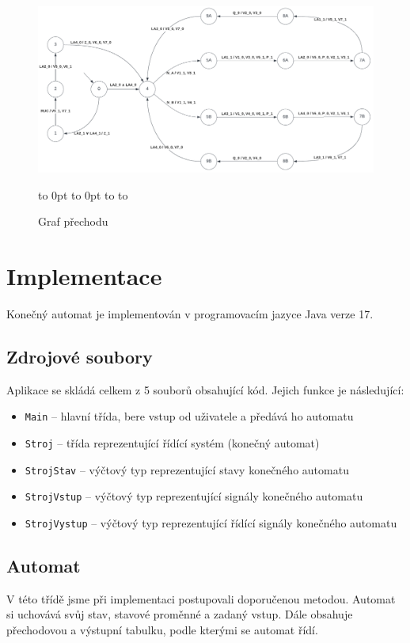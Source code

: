 \documentclass[12pt]{report}
\newcommand\horizontalpagenumber{
	\pagestyle{empty}
	\vbox to 0pt{\vss}\vfill
	\vbox to 0pt{\baselineskip0pt
	\hbox to\linewidth{\hss}
	\baselineskip\footskip
	\hbox to\linewidth{
	\hfil\thepage\hspace{30mm}}\vss}
}
\begin{document}
	\begin{landscape}
		\begin{figure}
			\centering
			\includegraphics[width=1.3\textwidth]{graf}
			\caption{Graf přechodu}
			\label{fig:graf}
			\horizontalpagenumber
			\end{figure}
	\end{landscape}
	\restoregeometry
	
	\chapter{Implementace}
	Konečný automat je implementován v programovacím jazyce Java verze 17.
	
	\section{Zdrojové soubory}
	Aplikace se skládá celkem z 5 souborů obsahující kód. Jejich funkce je následující:
	
	 \begin{itemize}
		\item \texttt{Main} – hlavní třída, bere vstup od uživatele a předává ho automatu
		\item \texttt{Stroj} – třída reprezentující řídící systém (konečný automat)
		\item \texttt{StrojStav} – výčtový typ reprezentující stavy konečného automatu
		\item \texttt{StrojVstup} – výčtový typ reprezentující signály konečného automatu
		\item \texttt{StrojVystup} – výčtový typ reprezentující řídící signály konečného automatu
	\end{itemize}	
	
	\section{Automat}
	V této třídě jsme při implementaci postupovali doporučenou metodou. Automat si uchovává svůj stav, stavové proměnné a zadaný vstup. Dále obsahuje přechodovou a výstupní tabulku, podle kterými se automat řídí.
	
\end{document}
